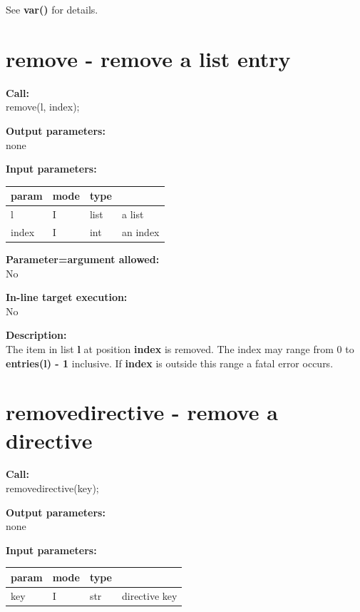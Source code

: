         See {\bf var()}  for details.



    \section{remove - remove a list entry}\label{sec:ipremove}
        
        {\bf Call:} \\
        remove(l, index);
        
        {\bf Output parameters:} \\
        none
        
        {\bf Input parameters:} \\
        \begin{tabular}{| l | l | l | l |}
        \hline
        param  & mode & type & \\
        \hline \hline
        l      & I     & list & a list   \\ \hline
        index  & I     & int  & an index   \\ \hline
        \end{tabular}
        
        {\bf Parameter=argument allowed:} \\
        No
        
        {\bf In-line target execution:} \\
        No
        
        {\bf Description:} \\
        The item in list {\bf l} at position {\bf index} is removed.
        The index may range from 0 to {\bf entries(l) - 1}
        inclusive. If {\bf index} is outside this range a fatal error
        occurs.

    \section{removedirective - remove a directive}\label{sec:ipremovedirective}
        
        {\bf Call:} \\
        removedirective(key);
        
        {\bf Output parameters:} \\
        none
        
        {\bf Input parameters:} \\
        \begin{tabular}{| l | l | l | l |}
        \hline
        param  & mode     & type  & \\
        \hline \hline
        key   & I & str & directive key     \\ \hline
        \end{tabular}
        
